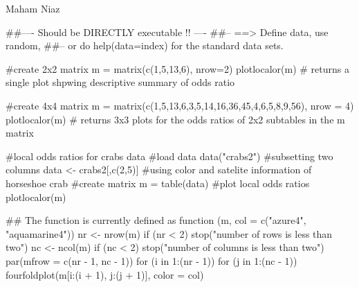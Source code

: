 \documentclass[letterpaper]{book}
\begin{document}
%
\begin{Author}\relax
Maham Niaz
\end{Author}
%
\begin{Examples}
\begin{ExampleCode}
##---- Should be DIRECTLY executable !! ----
##-- ==>  Define data, use random,
##--	or do  help(data=index)  for the standard data sets.

  #create 2x2 matrix
  m = matrix(c(1,5,13,6), nrow=2)
  plotlocalor(m) # returns a single plot shpwing descriptive summary of odds ratio
  
  #create 4x4 matrix
  m = matrix(c(1,5,13,6,3,5,14,16,36,45,4,6,5,8,9,56), nrow = 4)
  plotlocalor(m) # returns 3x3 plots for the odds ratios of 2x2 subtables in the m matrix
  
  #local odds ratios for crabs data
  #load data
  data("crabs2")
  #subsetting two columns
  data <- crabs2[,c(2,5)] #using color and satelite information of horseshoe crab
  #create matrix
  m = table(data)
  #plot local odds ratios 
  plotlocalor(m)
  
## The function is currently defined as
function (m, col = c("azure4", "aquamarine4")) 
{
    nr <- nrow(m)
    if (nr < 2) 
        stop("number of rows is less than two")
    nc <- ncol(m)
    if (nc < 2) 
        stop("number of columns is less than two")
    par(mfrow = c(nr - 1, nc - 1))
    for (i in 1:(nr - 1)) for (j in 1:(nc - 1)) {
        fourfoldplot(m[i:(i + 1), j:(j + 1)], color = col)
    }
  }
\end{ExampleCode}
\end{Examples}
\printindex{}
\end{document}
